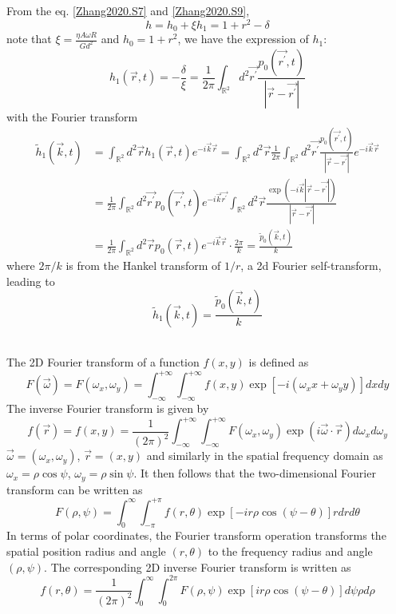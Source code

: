 \documentclass[books,12pt]{elegantpaper}
\begin{document}
From the eq. \ref{Zhang2020.S7} and \ref{Zhang2020.S9},
$$ h = h_0 + \xi h_1 = 1 + r^2 - \delta $$
note that $\xi = \frac{\eta A \omega R}{Gd^2}$ and $h_0 = 1+r^2$, we have the expression of $h_1$:
\begin{equation} h_1 (\vec{r},t) = - \frac{\delta}{\xi} = \frac{1}{2\pi} \int_{\mathbb{R}^2} d^2 \vec{r^\prime} \frac{p_0 (\vec{r^\prime},t)}{\left\vert \vec{r} - \vec{r^\prime} \right\vert} \tag{Zhang2020.S16} \end{equation}
with the Fourier transform
$$ \begin{align}
\tilde{h}_1 (\vec{k},t) &= \int_{\mathbb{R}^2} d^2 \vec{r} h_1 (\vec{r},t) e^{-i\vec{k}\vec{r}} = \int_{\mathbb{R}^2} d^2 \vec{r} \frac{1}{2\pi} \int_{\mathbb{R}^2} d^2 \vec{r^\prime} \frac{p_0 (\vec{r^\prime},t)}{\left\vert \vec{r} - \vec{r^\prime} \right\vert} e^{-i\vec{k}\vec{r}} \\
&= \frac{1}{2\pi} \int_{\mathbb{R}^2} d^2 \vec{r^\prime} p_0 (\vec{r^\prime},t) e^{-i\vec{k}\vec{r^\prime}} \int_{\mathbb{R}^2} d^2 \vec{r} \frac{\exp\left( -i\vec{k} \left\vert \vec{r} - \vec{r^\prime} \right\vert \right)}{\left\vert \vec{r} - \vec{r^\prime} \right\vert} \\
&= \frac{1}{2\pi} \int_{\mathbb{R}^2} d^2 \vec{r} p_0 (\vec{r},t) e^{-i\vec{k}\vec{r}} \cdot \frac{2\pi}{k} = \frac{\tilde{p}_0 (\vec{k},t)}{k}
\end{align} $$
where $2\pi/k$ is from the Hankel transform of $1/r$, a 2d Fourier self-transform, leading to
\begin{equation} \tilde{h}_1 (\vec{k},t) = \frac{\tilde{p}_0 (\vec{k},t)}{k} \tag{Zhang2020.S17} \end{equation}

\hline

\ \\

The 2D Fourier transform of a function $f(x,y)$ is defined as 
$$ F(\vec\omega) = F(\omega_x,\omega_y) = \int_{-\infty}^{+\infty} \int_{-\infty}^{+\infty} f(x,y) \exp\left[ -i (\omega_x x + \omega_y y) \right] dx dy $$
The inverse Fourier transform is given by
$$ f(\vec{r}) = f(x,y) = \frac{1}{(2\pi)^2} \int_{-\infty}^{+\infty} \int_{-\infty}^{+\infty} F(\omega_x,\omega_y) \exp(i\vec\omega \cdot \vec{r}) d\omega_x d\omega_y $$
$\vec\omega = (\omega_x,\omega_y)$, $\vec{r}=(x,y)$ and similarly in the spatial frequency domain as $\omega_x = \rho \cos\psi$, $\omega_y = \rho \sin\psi$. It then follows that the two-dimensional Fourier transform can be written as
$$ F(\rho,\psi) = \int_0^\infty \int_{-\pi}^{+\pi} f(r,\theta) \exp \left[ -ir\rho \cos(\psi-\theta) \right] rdr d\theta $$
In terms of polar coordinates, the Fourier transform operation transforms the spatial position radius and angle $(r,\theta)$ to the frequency radius and angle $(\rho,\psi)$. The corresponding 2D inverse Fourier transform is written as
$$ f(r,\theta) = \frac{1}{(2\pi)^2} \int_0^\infty \int_0^{2\pi} F(\rho,\psi) \exp \left[ ir\rho \cos(\psi-\theta) \right] d\psi \rho d\rho $$
\end{document}
